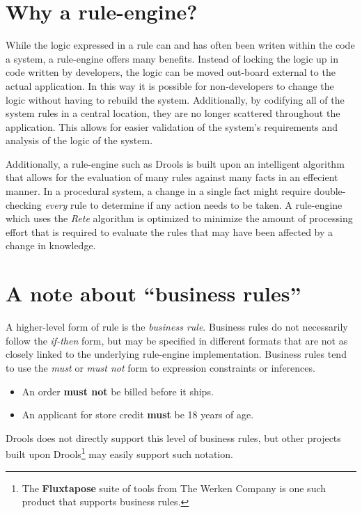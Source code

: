 \section{Why a rule-engine?}

While the logic expressed in a rule can and has often been writen
within the code a system, a rule-engine offers many benefits.  Instead
of locking the logic up in code written by developers, the logic can
be moved out-board external to the actual application.  In this way
it is possible for non-developers to change the logic without having
to rebuild the system.  Additionally, by codifying all of the system
rules in a central location, they are no longer scattered throughout
the application.  This allows for easier validation of the system's
requirements and analysis of the logic of the system.

Additionally, a rule-engine such as Drools is built upon an
intelligent algorithm that allows for the evaluation of many
rules against many facts in an effecient manner.  In a procedural
system, a change in a single fact might require double-checking
\emph{every} rule to determine if any action needs to be taken.
A rule-engine which uses the \emph{Rete} algorithm
is optimized to minimize the amount of processing effort that is
required to evaluate the rules that may have been affected by
a change in knowledge.

\section{A note about ``business rules''}

A higher-level form of rule is the \emph{business rule}.  Business rules do not necessarily follow the \emph{if-then}
form, but may be specified in different formats that are not as
closely linked to the underlying rule-engine implementation.  Business
rules tend to use the \emph{must} or \emph{must not} form to
expression constraints or inferences.

\begin{itemize}
  \item An order \textbf{must not} be billed before it ships.
  \item An applicant for store credit \textbf{must} be 18 years of age.
\end{itemize}

Drools does not directly support this level of business rules, but
other projects built upon Drools\footnote{The \textbf{Fluxtapose}
suite of tools from The Werken Company is one such product that
supports business rules.} may easily support such
notation.

